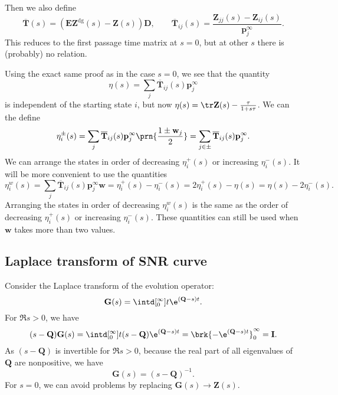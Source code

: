 \documentclass[12pt]{article}
\newcommand{\inv}{^{-1}}
\newcommand{\dg}{^\mathrm{dg}}
\newcommand{\I}{\mathbf{I}}
\newcommand{\onem}{\mathbf{E}}
\newcommand{\MM}{\mathbf{Q}}
\newcommand{\pr}{\mathbf{p}}
\newcommand{\eq}{\pr^\infty}
\newcommand{\fpt}{\mathbf{T}}
\newcommand{\fptb}{\overline{\fpt}}
\newcommand{\fund}{\mathbf{Z}}
\newcommand{\D}{\mathbf{D}}
\newcommand{\w}{\mathbf{w}}
\begin{document}
Then we also define
%
\begin{equation}\label{eq:lfptb}
  \fptb(s) = (\onem\fund\dg(s)-\fund(s))\D,
  \qquad
  \fptb_{ij}(s) = \frac{\fund_{jj}(s)-\fund_{ij}(s)}{\eq_j}.
\end{equation}
%
This reduces to the first passage time matrix at $s=0$, but at other $s$ there is (probably) no relation.

Using the exact same proof as in the case $s=0$, we see that the quantity
%
\begin{equation}\label{eq:lkemeny}
  \eta(s) = \sum_j \fptb_{ij}(s)\eq_j
\end{equation}
%
is independent of the starting state $i$, but now $\eta(s) = \tr\fund(s) - \frac{\tau}{1+s\tau}$.
We can the define
%
\begin{equation}\label{eq:lpmixtime}
  \eta^{\pm}_i(s) = \sum_j \fptb_{ij}(s)\eq_j \prn{\frac{1\pm\w_j}{2}} =  \sum_{j\in\pm} \fptb_{ij}(s)\eq_j.
\end{equation}
%
We can arrange the states in order of decreasing $\eta^{+}_i(s)$ or increasing $\eta^{-}_i(s)$.
It will be more convenient to use the quantities
%
\begin{equation}\label{eq:lwpmixtime}
  \eta^w_i(s) = \sum_j \fptb_{ij}(s)\eq_j \w
    = \eta^+_i(s) - \eta^-_i(s) =2\eta^+_i(s) - \eta(s) =\eta(s) - 2\eta^-_i(s) .
\end{equation}
%
Arranging the states in order of decreasing $\eta^w_i(s)$ is the same as the order of decreasing $\eta^{+}_i(s)$ or increasing $\eta^{-}_i(s)$.
These quantities can still be used when $\w$ takes more than two values.



\subsection{Laplace transform of SNR curve}\label{sec:laplaceSNR}

Consider the Laplace transform of the evolution operator:
%
\begin{equation}\label{eq:levol}
  \mathbf{G}(s) = \intd[_0^{\infty}]{t} \e^{(\MM-s) t}.
\end{equation}
%
For $\Re s>0$, we have
%
\begin{equation}\label{eq:levolcalc}
  (s-\MM)\mathbf{G}(s) = \intd[_0^{\infty}]{t} (s-\MM)\e^{(\MM-s) t} = \brk{-\e^{(\MM-s) t}}_0^{\infty} = \I.
\end{equation}
%
As $(s-\MM)$ is invertible for $\Re s>0$, because the real part of all eigenvalues of $\MM$ are nonpositive, we have
%
\begin{equation}\label{eq:levolres}
  \mathbf{G}(s) = (s-\MM)\inv.
\end{equation}
%
For $s=0$, we can avoid problems by replacing $\mathbf{G}(s) \to \fund(s)$.
\end{document}
